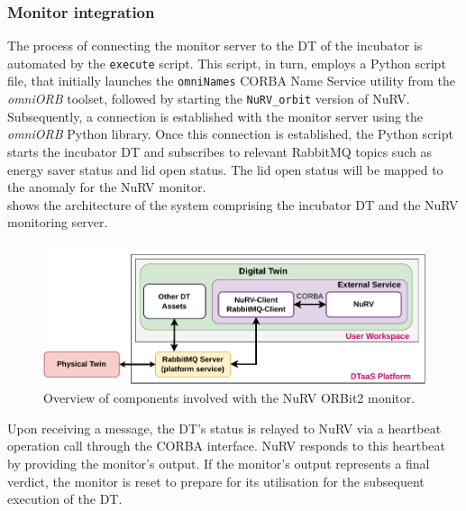 \subsubsection{Monitor integration}
The process of connecting the monitor server to the DT of the incubator is automated by the \texttt{execute} script. This script, in turn, employs a Python script file, that initially launches the \texttt{omniNames} CORBA Name Service utility from the \textit{omniORB} toolset, followed by starting the \texttt{NuRV\_orbit} version of NuRV. Subsequently, a connection is established with the monitor server using the \textit{omniORB} Python library. Once this connection is established, the Python script starts the incubator DT and subscribes to relevant RabbitMQ topics such as energy saver status and lid open status. The lid open status will be mapped to the anomaly for the NuRV monitor.\\
 shows the architecture of the system comprising the incubator DT and the NuRV monitoring server.%
%
\begin{figure}[ht]
	\centering
	\includegraphics[width=\columnwidth]{images/NuRV-native-integration.pdf}
	\caption{Overview of components involved with the NuRV ORBit2 monitor.}
	\label{fig:nurv-orbit-architecture-diagram}
\end{figure}
%
Upon receiving a message, the DT's status is relayed to NuRV via a heartbeat operation call through the CORBA interface. NuRV responds to this heartbeat by providing the monitor's output. If the monitor's output represents a final verdict, the monitor is reset to prepare for its utilisation for the subsequent execution of the DT.
